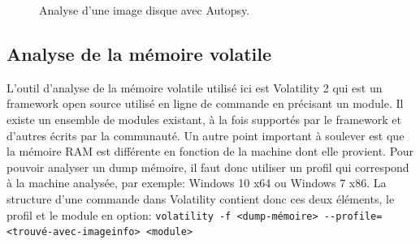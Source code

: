 \begin{figure}
    \centering
    \caption{Analyse d'une image disque avec Autopsy.}
    \label{fig:autopsy-analysis}
\end{figure}





\subsection{Analyse de la mémoire volatile}

L'outil d'analyse de la mémoire volatile utilisé ici est Volatility 2 qui est un framework open source utilisé en ligne de commande en précisant un module. Il existe un ensemble de modules existant, à la fois supportés par le framework et d'autres écrits par la communauté. Un autre point important à soulever est que la mémoire RAM est différente en fonction de la machine dont elle provient. Pour pouvoir analyser un dump mémoire, il faut donc utiliser un profil qui correspond à la machine analysée, par exemple: Windows 10 x64 ou Windows 7 x86. La structure d'une commande dans Volatility contient donc ces deux éléments, le profil et le module en option: \texttt{volatility -f <dump-mémoire> -{}-profile=<trouvé-avec-imageinfo> <module>}

